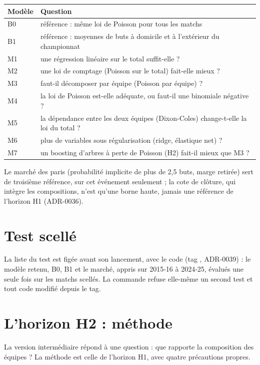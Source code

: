 \begin{center}
\begin{tabularx}{\textwidth}{lX}
\toprule
Modèle & Question \\
\midrule
B0 & référence : même loi de Poisson pour tous les matchs \\
B1 & référence : moyennes de buts à domicile et à l'extérieur du championnat \\
M1 & une régression linéaire sur le total suffit-elle ? \\
M2 & une loi de comptage (Poisson sur le total) fait-elle mieux ? \\
M3 & faut-il décomposer par équipe (Poisson par équipe) ? \\
M4 & la loi de Poisson est-elle adéquate, ou faut-il une binomiale négative ? \\
M5 & la dépendance entre les deux équipes (Dixon-Coles) change-t-elle la loi du total ? \\
M6 & plus de variables sous régularisation (ridge, élastique net) ? \\
M7 & un boosting d'arbres à perte de Poisson (H2) fait-il mieux que M3 ? \\
\bottomrule
\end{tabularx}
\end{center}

Le marché des paris (probabilité implicite de plus de 2,5 buts, marge retirée) sert de troisième
référence, sur cet événement seulement ; la cote de clôture, qui intègre les compositions, n'est
qu'une borne haute, jamais une référence de l'horizon H1 (ADR-0036).

\section{Test scellé}

La liste du test est figée avant son lancement, avec le code (tag , ADR-0039) : le
modèle retenu, B0, B1 et le marché, appris sur 2015-16 à 2024-25, évalués une seule fois sur les matchs
scellés. La commande refuse elle-même un second test et tout code modifié depuis le tag.

\section{L'horizon H2 : méthode}
\label{sec:methode-h2}

La version intermédiaire répond à une question : que rapporte la composition des équipes ? La méthode est
celle de l'horizon H1, avec quatre précautions propres.

